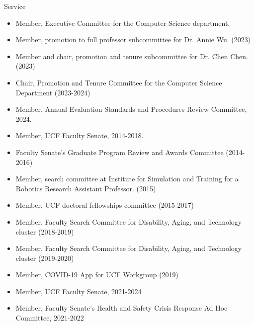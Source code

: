 \begin{category}{Service}
\begin{itemize}
\item Member, Executive Committee for the Computer Science department.

\item Member, promotion to full professor subcommittee for Dr. Annie Wu. (2023)

\item Member and chair, promotion and tenure subcommittee for Dr. Chen Chen. (2023)

\item Chair, Promotion and Tenure Committee for the Computer Science Department (2023-2024)

\item Member, Annual Evaluation Standards and Procedures Review Committee, 2024. 

\end{itemize}

%
%

\begin{itemize}

\item Member, UCF Faculty Senate, 2014-2018.

\item Faculty Senate's Graduate Program Review and Awards Committee (2014-2016)

\item Member, search committee at Institute for Simulation and Training for a Robotics Research Assistant Professor. (2015)

\item Member, UCF doctoral fellowships committee (2015-2017)

\item Member, Faculty Search Committee for Disability, Aging, and Technology cluster (2018-2019)

\item Member, Faculty Search Committee for Disability, Aging, and Technology cluster (2019-2020)

\item Member, COVID-19 App for UCF Workgroup (2019)

\item Member, UCF Faculty Senate, 2021-2024

\item Member, Faculty Senate's Health and Safety Crisis Response Ad Hoc Committee, 2021-2022


\end{itemize}
\end{category}
